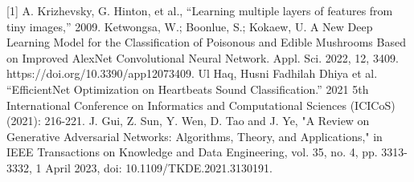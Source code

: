 [1] A. Krizhevsky, G. Hinton, et al., “Learning multiple layers of features
from tiny images,” 2009.
\hfill \break
[2] Ketwongsa, W.; Boonlue, S.; Kokaew, U. A New Deep Learning Model for the Classification of Poisonous and Edible Mushrooms Based on Improved AlexNet Convolutional Neural Network. Appl. Sci. 2022, 12, 3409. https://doi.org/10.3390/app12073409.
\hfill \break
[3]  Ul Haq, Husni Fadhilah Dhiya et al. “EfficientNet Optimization on Heartbeats Sound Classification.” 2021 5th International Conference on Informatics and Computational Sciences (ICICoS) (2021): 216-221.
\hfill \break
[4] J. Gui, Z. Sun, Y. Wen, D. Tao and J. Ye, "A Review on Generative Adversarial Networks: Algorithms, Theory, and Applications," in IEEE Transactions on Knowledge and Data Engineering, vol. 35, no. 4, pp. 3313-3332, 1 April 2023, doi: 10.1109/TKDE.2021.3130191.
